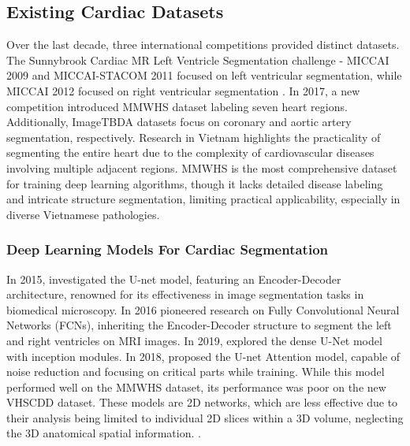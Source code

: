 \documentclass{article}
\begin{document}
\begin{multicols}{2}
\subsection{Existing Cardiac Datasets}
Over the last decade, three international competitions provided distinct datasets. The Sunnybrook Cardiac MR Left Ventricle Segmentation challenge - MICCAI 2009 \cite{left_ventricle} and MICCAI-STACOM 2011 \cite{quantification} focused on left ventricular segmentation, while MICCAI 2012 focused on right ventricular segmentation \cite{right_ventricle}. In 2017, a new competition introduced MMWHS dataset labeling seven heart regions. Additionally, ImageTBDA datasets focus on coronary and aortic artery segmentation, respectively. Research in Vietnam highlights the practicality of segmenting the entire heart due to the complexity of cardiovascular diseases involving multiple adjacent regions. MMWHS is the most comprehensive dataset for training deep learning algorithms, though it lacks detailed disease labeling and intricate structure segmentation, limiting practical applicability, especially in diverse Vietnamese pathologies.

\subsubsection{Deep Learning Models For Cardiac Segmentation}
In 2015, \cite{unet} investigated the U-net model, featuring an Encoder-Decoder architecture, renowned for its effectiveness in image segmentation tasks in biomedical microscopy. In 2016 \cite{tran} pioneered research on Fully Convolutional Neural Networks (FCNs), inheriting the Encoder-Decoder structure to segment the left and right ventricles on MRI images. In 2019, \cite{DenseNets} explored the dense U-Net model with inception modules. In 2018, \cite{attention_unet} proposed the U-net Attention model, capable of noise reduction and focusing on critical parts while training. While this model performed well on the MMWHS dataset, its performance was poor on the new VHSCDD dataset. These models are 2D networks, which are less effective due to their analysis being limited to individual 2D slices within a 3D volume, neglecting the 3D anatomical spatial information. \cite{deep_review}. 


\end{multicols}
\end{document}
